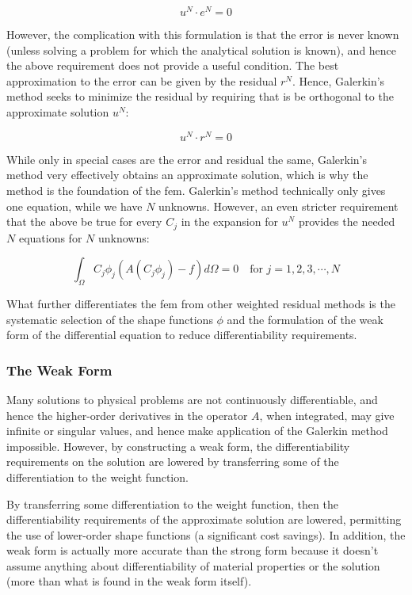 \documentclass[10pt]{article}
\numberwithin{equation}{section} %
\begin{document}
\begin{equation}
u^N\cdot e^N=0
\end{equation}

However, the complication with this formulation is that the error is never known (unless solving a problem for which the analytical solution is known), and hence the above requirement does not provide a useful condition. The best approximation to the error can be given by the residual \(r^N\). Hence, Galerkin's method seeks to minimize the residual by requiring that is be orthogonal to the approximate solution \(u^N\):

\begin{equation}
u^N\cdot r^N=0
\end{equation}

While only in special cases are the error and residual the same, Galerkin's method very effectively obtains an approximate solution, which is why the method is the foundation of the \gls{fem}. Galerkin's method technically only gives one equation, while we have \(N\) unknowns. However, an even stricter requirement that the above be true for every \(C_j\) in the expansion for \(u^N\) provides the needed \(N\) equations for \(N\) unknowns:

\begin{equation} 
\int_{\Omega}C_j\phi_j\left(A(C_j\phi_j)-f\right)d\Omega=0\quad\text{for } j=1, 2, 3, \cdots, N
\end{equation}

What further differentiates the \gls{fem} from other weighted residual methods is the systematic selection of the shape functions \(\phi\) and the formulation of the weak form of the differential equation to reduce differentiability requirements.

\subsubsection{The Weak Form}

Many solutions to physical problems are not continuously differentiable, and hence the higher-order derivatives in the operator \(A\), when integrated, may give infinite or singular values, and hence make application of the Galerkin method impossible. However, by constructing a weak form, the differentiability requirements on the solution are lowered by transferring some of the differentiation to the weight function.

By transferring some differentiation to the weight function, then the differentiability requirements of the approximate solution are lowered, permitting the use of lower-order shape functions (a significant cost savings). In addition, the weak form is actually more accurate than the strong form because it doesn't assume anything about differentiability of material properties or the solution (more than what is found in the weak form itself). 
\end{document}
